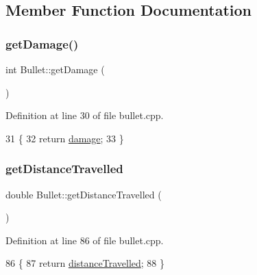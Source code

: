 \subsection{Member Function Documentation}
\mbox{\label{class_bullet_a682701fa7f9d4a9564dbcd6ed3f73588}} 
\subsubsection{\texorpdfstring{get\+Damage()}{getDamage()}}
{\footnotesize\ttfamily int Bullet\+::get\+Damage (\begin{DoxyParamCaption}{ }\end{DoxyParamCaption})}



Definition at line 30 of file bullet.\+cpp.


\begin{DoxyCode}
31 \{
32     \textcolor{keywordflow}{return} \hyperlink{class_bullet_a733d2ebbf9143c9ca68d3eb7e14121d0}{damage};
33 \}
\end{DoxyCode}
\mbox{\label{class_bullet_ade9a9d09e42c002c7d30b65299194588}} 
\subsubsection{\texorpdfstring{get\+Distance\+Travelled}{getDistanceTravelled}}
{\footnotesize\ttfamily double Bullet\+::get\+Distance\+Travelled (\begin{DoxyParamCaption}{ }\end{DoxyParamCaption})\hspace{0.3cm}{\ttfamily [slot]}}



Definition at line 86 of file bullet.\+cpp.


\begin{DoxyCode}
86                                    \{
87     \textcolor{keywordflow}{return} \hyperlink{class_bullet_afe194c1b7e495d0c17492396595202e1}{distanceTravelled};
88 \}
\end{DoxyCode}
\mbox{\label{class_bullet_ada7a5f48649b2dc81ab1952cff51b6d9}} 
